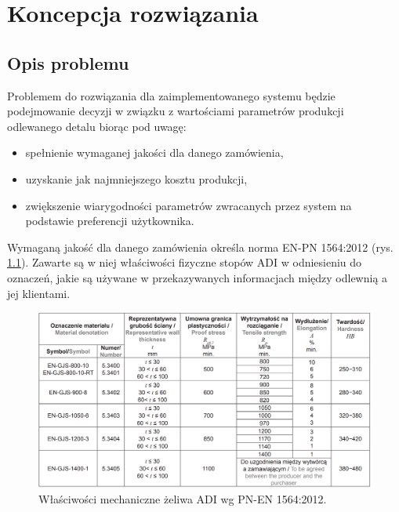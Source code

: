    
\chapter{Koncepcja rozwiązania} \label{chap:methodology}

\section{Opis problemu}
\label{sec:problemDescription}
Problemem do rozwiązania dla zaimplementowanego systemu będzie podejmowanie decyzji w związku z wartościami parametrów produkcji odlewanego detalu biorąc pod uwagę:
\begin{itemize}
    \item spełnienie wymaganej jakości dla danego zamówienia,
    \item uzyskanie jak najmniejszego kosztu produkcji,
    \item zwiększenie wiarygodności parametrów zwracanych przez system na podstawie preferencji użytkownika.
\end{itemize}

Wymaganą jakość dla danego zamówienia określa norma EN-PN 1564:2012 \cite{pnen1564} (rys. \ref{fig:en-pn-1564}). Zawarte są w niej właściwości fizyczne stopów ADI w odniesieniu do oznaczeń, jakie są używane w przekazywanych informacjach między odlewnią a jej klientami.
\begin{figure}[ht]{}
	\centering
	\includegraphics[scale=0.35]{images/en-pn-1564.PNG}
	\caption {
		 Właściwości mechaniczne żeliwa ADI wg PN-EN 1564:2012.
	}
	\label{fig:en-pn-1564}
\end{figure}

